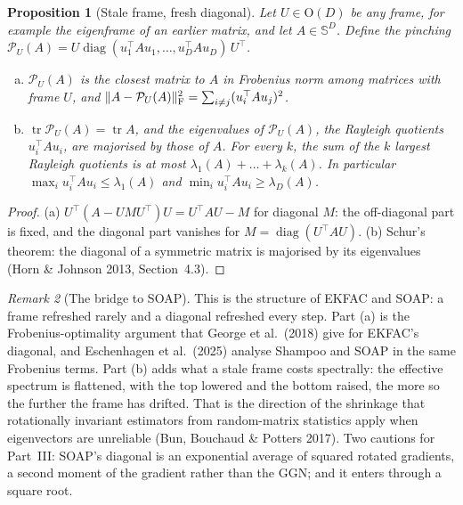 \documentclass[11pt,a4paper]{article}
\newcommand{\Orth}{\mathrm{O}}
\newcommand{\Sym}{\mathbb{S}}
\DeclareMathOperator{\tr}{tr}
\DeclareMathOperator{\diag}{diag}
\DeclarePairedDelimiter{\norm}{\lVert}{\rVert}
\newcommand{\F}{\mathrm{F}}
\theoremstyle{plain}
\newtheorem{proposition}{Proposition}[section]
\theoremstyle{definition}
\theoremstyle{remark}
\newtheorem{remark}[proposition]{Remark}
\begin{document}
\begin{proposition}[Stale frame, fresh diagonal]\label{prop:pinching}
Let $U\in\Orth(D)$ be any frame, for example the eigenframe of an earlier matrix, and let $A\in\Sym^D$. Define the
pinching $\mathcal{P}_U(A)=U\diag(u_1^\top Au_1,\dots,u_D^\top Au_D)\,U^\top$.
\begin{enumerate}[(a)]
\item $\mathcal{P}_U(A)$ is the closest matrix to $A$ in Frobenius norm among matrices with frame $U$, and
  $\norm{A-\mathcal{P}_U(A)}_\F^2=\sum_{i\ne j}(u_i^\top Au_j)^2$.
\item $\tr\mathcal{P}_U(A)=\tr A$, and the eigenvalues of $\mathcal{P}_U(A)$, the Rayleigh quotients $u_i^\top Au_i$,
  are majorised by those of $A$. For every $k$, the sum of the $k$ largest Rayleigh quotients is at most
  $\lambda_1(A)+\dots+\lambda_k(A)$. In particular $\max_iu_i^\top Au_i\le\lambda_1(A)$ and
  $\min_iu_i^\top Au_i\ge\lambda_D(A)$.
\end{enumerate}
\end{proposition}
\begin{proof}
(a) $U^\top(A-UMU^\top)U=U^\top AU-M$ for diagonal $M$: the off-diagonal part is fixed, and the diagonal part
vanishes for $M=\diag(U^\top AU)$. (b) Schur's theorem: the diagonal of a symmetric matrix is majorised by its
eigenvalues (Horn \& Johnson 2013, Section~4.3).
\end{proof}

\begin{remark}[The bridge to SOAP]\label{rem:soap}
This is the structure of EKFAC and SOAP: a frame refreshed rarely and a diagonal refreshed every step. Part (a) is
the Frobenius-optimality argument that George et al.\ (2018) give for EKFAC's diagonal, and Eschenhagen et al.\
(2025) analyse Shampoo and SOAP in the same Frobenius terms. Part (b) adds what a stale frame costs spectrally: the
effective spectrum is flattened, with the top lowered and the bottom raised, the more so the further the frame has
drifted. That is the direction of the shrinkage that rotationally invariant estimators from random-matrix statistics
apply when eigenvectors are unreliable (Bun, Bouchaud \& Potters 2017). Two cautions for Part~III: SOAP's diagonal
is an exponential average of squared rotated gradients, a second moment of the gradient rather than the GGN; and it
enters through a square root.
\end{remark}
\end{document}
